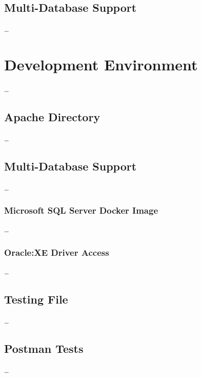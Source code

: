 \subsection{Multi-Database Support}
\dots

\section{Development Environment}\label{cha:implementation:sec:development}
\dots

\subsection{Apache Directory}
\dots
\subsection{Multi-Database Support}
\dots
\subsubsection{Microsoft SQL Server Docker Image}
\dots
\subsubsection{Oracle:XE Driver Access}
\dots
\subsection{Testing File}
\dots
\subsection{Postman Tests}
\dots


